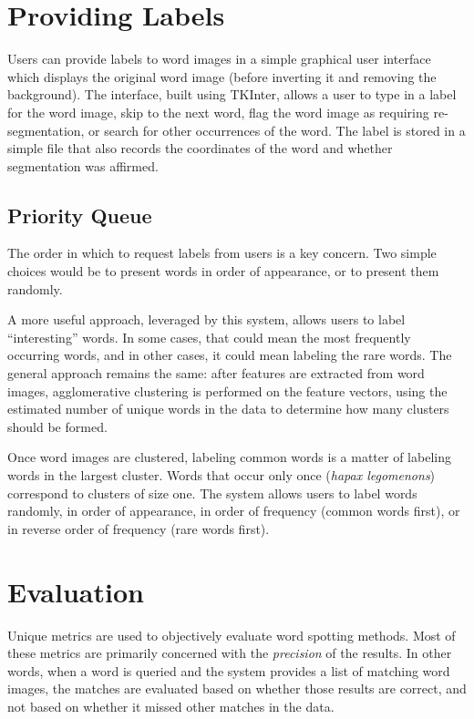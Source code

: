 \documentclass[final]{ukthesis}
\begin{document}
\section{Providing Labels}
Users can provide labels to word images in a simple graphical user interface which displays the original word image (before inverting it and removing the background). The interface, built using TKInter, allows a user to type in a label for the word image, skip to the next word, flag the word image as requiring re-segmentation, or search for other occurrences of the word. The label is stored in a simple file that also records the coordinates of the word and whether segmentation was affirmed.

\subsection{Priority Queue}
The order in which to request labels from users is a key concern. Two simple choices would be to present words in order of appearance, or to present them randomly.

A more useful approach, leveraged by this system, allows users to label ``interesting'' words. In some cases, that could mean the most frequently occurring words, and in other cases, it could mean labeling the rare words. The general approach remains the same: after features are extracted from word images, agglomerative clustering is performed on the feature vectors, using the estimated number of unique words in the data to determine how many clusters should be formed.

Once word images are clustered, labeling common words is a matter of labeling words in the largest cluster. Words that occur only once ({\em hapax legomenons}) correspond to clusters of size one. The system allows users to label words randomly, in order of appearance, in order of frequency (common words first), or in reverse order of frequency (rare words first).


%
%
\section{Evaluation}
\label{sec:evaluation}
Unique metrics are used to objectively evaluate word spotting methods. Most of these metrics are primarily concerned with the {\em precision} of the results. In other words, when a word is queried and the system provides a list of matching word images, the matches are evaluated based on whether those results are correct, and not based on whether it missed other matches in the data.
\end{document}
